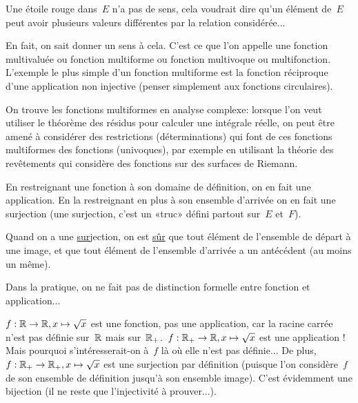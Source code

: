 Une étoile rouge dans~$E$ n'a pas de sens, cela voudrait dire qu'un élément de~$E$ peut avoir plusieurs valeurs différentes par la relation considérée...

 En fait, on sait donner un sens à cela. C'est ce que l'on appelle une fonction multivaluée ou fonction multiforme ou fonction multivoque ou multifonction.
L'exemple le plus simple d'un fonction multiforme est la fonction réciproque d'une application non injective (penser simplement aux fonctions circulaires).

On trouve les fonctions multiformes en analyse complexe: lorsque l'on veut utiliser le théorème des résidus pour calculer une intégrale réelle, on peut être amené à considérer des restrictions (déterminations) qui font de ces fonctions multiformes des fonctions (univoques), par exemple en utilisant la théorie des revêtements qui considère des fonctions sur des surfaces de Riemann.

\medskip
En restreignant une fonction à son domaine de définition, on en fait une application.
En la restreignant en plus à son ensemble d'arrivée on en fait une surjection (une surjection, c'est un «truc» défini partout sur~$E$ et~$F$).

Quand on a une \underline{sur}jection, on est \underline{sûr} que tout élément de l'ensemble de départ à une image, et que tout élément de l'ensemble d'arrivée a un antécédent (au moins un même).%

Dans la pratique, on ne fait pas de distinction formelle entre fonction et application...

$f: \mathbb R\to\mathbb R, x\mapsto\sqrt{x}$ est une fonction, pas une application, car la racine carrée n'est pas définie sur~$\mathbb R$ mais sur~$\mathbb R_+$.~$f: \mathbb R_+\to\mathbb R, x\mapsto\sqrt{x}$ est une application ! Mais pourquoi s'intéresserait-on à~$f$ là où elle n'est pas définie... De plus, $f: \mathbb R_+\to\mathbb R_+, x\mapsto\sqrt{x}$ est une surjection par définition (puisque l'on considère~$f$ de son ensemble de définition jusqu'à son ensemble image). C'est évidemment une bijection (il ne reste que l'injectivité à prouver...).

